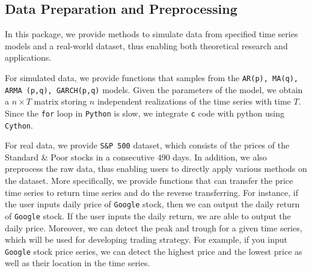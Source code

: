 
\subsection{Data Preparation and  Preprocessing}

In this package, we provide methods to simulate data from specified time series models and a real-world dataset, thus enabling both theoretical research and applications. 

For simulated data, we provide functions that samples from the \texttt{AR(p), MA(q), ARMA (p,q), GARCH(p,q)} models. Given the parameters of the model, we obtain a $n\times T$ matrix storing  $n$ independent realizations of the time series with time $T$. Since the \texttt{for} loop in \texttt{Python}
is slow, we integrate \texttt{c} code with python using \texttt{Cython}.

For real data, we  provide \texttt{S\&P 500} dataset, which consists of the prices of the Standard \& Poor stocks in a consecutive $490$ days.  In addition, we also  preprocess the raw data, thus enabling users to directly apply various methods on the dataset. More specifically, we provide functions that can transfer the price time series to return time series and do the reverse transferring. For instance, if the user inputs daily price of \texttt{Google} stock, then we can output the daily return of \texttt{Google} stock. If the user inputs the daily return,  we are able to output the daily price. Moreover, we can detect the peak and trough for a given time series, which will be used for developing trading strategy. For example, if you input \texttt{Google} stock price series, we can detect the highest price and the lowest price as well as their location in the time series.
